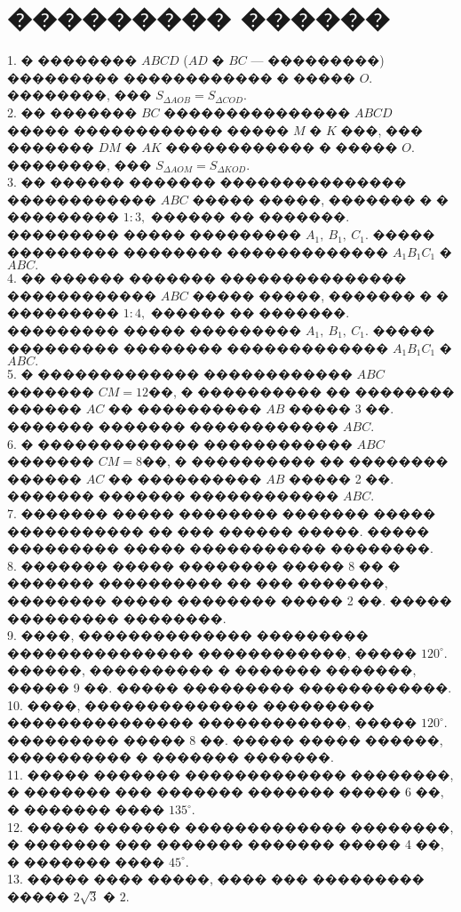 \documentclass[12pt]{article}
\begin{document}
\section{��������� ������}
1. � �������� $ABCD$ ($AD$ � $BC$ --- ���������) ��������� ������������ � ����� $O.$ ��������, ��� $S_{\Delta AOB}=S_{\Delta COD}.$\\
2. �� ������� $BC$ ��������������� $ABCD$ ����� ������������ ����� $M$ � $K$ ���, ��� ������� $DM$ � $AK$ ������������ � ����� $O.$ ��������, ��� $S_{\Delta AOM}=S_{\Delta KOD}.$\\
3. �� ������ ������� ��������������� ������������ $ABC$ ����� �����, ������� � � ��������� $1:3,$ ������ �� �������. ��������� ����� ��������� $A_1,\ B_1,\ C_1.$ ����� ��������� �������� ������������� $A_1B_1C_1$ � $ABC.$\\
4. �� ������ ������� ��������������� ������������ $ABC$ ����� �����, ������� � � ��������� $1:4,$ ������ �� �������. ��������� ����� ��������� $A_1,\ B_1,\ C_1.$ ����� ��������� �������� ������������� $A_1B_1C_1$ � $ABC.$\\
5. � ������������� ������������ $ABC$ ������� $CM=12$��, � ���������� �� �������� ������ $AC$ �� ���������� $AB$ ����� 3 ��. ������� ������� ������������ $ABC.$\\
6. � ������������� ������������ $ABC$ ������� $CM=8$��, � ���������� �� �������� ������ $AC$ �� ���������� $AB$ ����� 2 ��. ������� ������� ������������ $ABC.$\\
7. ������� ����� �������� ������� ����� ����������� �� ��� ������ �����. ����� ��������� ����� ����������� ��������.\\
8. ������� ����� �������� ����� 8 �� � ������� ���������� �� ��� �������, �������� ����� �������� ����� 2 ��. ����� ��������� ��������.\\
9. ����, �������������� ��������� ��������������� ������������, ����� $120^\circ.$ ������, ���������� � ������� �������, ����� 9 ��. ����� ��������� ������������.\\
10. ����, �������������� ��������� ��������������� ������������, ����� $120^\circ.$ ��������� ����� 8 ��. ����� ����� ������, ���������� � ������� �������.\\
11. ����� ������� ������������� ��������, � ������� ��� ������� ������� ����� 6 ��, � ������� ���� $135^\circ.$\\
12. ����� ������� ������������� ��������, � ������� ��� ������� ������� ����� 4 ��, � ������� ���� $45^\circ.$\\
13. ����� ���� �����, ���� ��� ��������� ����� $2\sqrt{3}$ � $2.$\\
\end{document}
